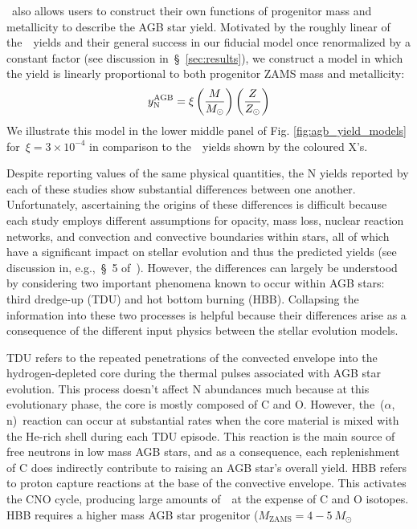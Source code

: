 \documentclass[ms.tex]{subfiles}
\begin{document}
\vice~also allows users to construct their own functions of progenitor mass
and metallicity to describe the AGB star yield.
Motivated by the roughly linear of the~\cristallo~yields and their general
success in our fiducial model once renormalized by a constant factor (see
discussion in~\S~\ref{sec:results}), we construct a model in which the yield
is linearly proportional to both progenitor ZAMS mass and metallicity:
\begin{equation}
y_\text{N}^\text{AGB} = \xi \left(\frac{M}{M_\odot}\right) \left(\frac{Z}{Z_\odot}\right)
\end{equation}
We illustrate this model in the lower middle panel of Fig.
\ref{fig:agb_yield_models} for~$\xi = 3\times10^{-4}$ in comparison to
the~\cristallo~yields shown by the coloured X's.
\par
Despite reporting values of the same physical quantities, the N yields
reported by each of these studies show substantial differences between one
another.
Unfortunately, ascertaining the origins of these differences is difficult
because each study employs different assumptions for opacity, mass loss,
nuclear reaction networks, and convection and convective boundaries within
stars, all of which have a significant impact on stellar evolution and thus
the predicted yields (see discussion in, e.g.,~\S~5 of~\citealp{Karakas2016}).
However, the differences can largely be understood by considering two important
phenomena known to occur within AGB stars: third dredge-up (TDU) and hot bottom
burning (HBB).
Collapsing the information into these two processes is helpful because their
differences arise as a consequence of the different input physics between the
stellar evolution models.
\par
TDU refers to the repeated penetrations of the convected envelope into the
hydrogen-depleted core during the thermal pulses associated with AGB star
evolution.
This process doesn't affect N abundances much because at this evolutionary
phase, the core is mostly composed of C and O.
However, the~\Cthirteen($\alpha$, n)\Osixteen~reaction can occur at substantial
rates when the core material is mixed with the He-rich shell during each TDU
episode.
This reaction is the main source of free neutrons in low mass AGB stars, and as
a consequence, each replenishment of C does indirectly contribute to raising
an AGB star's overall yield.
HBB refers to proton capture reactions at the base of the convective envelope.
This activates the CNO cycle, producing large amounts of~\Nfourteen~at the
expense of C and O isotopes.
HBB requires a higher mass AGB star progenitor ($M_\text{ZAMS} = 4 - 5~M_\odot$
\end{document}

